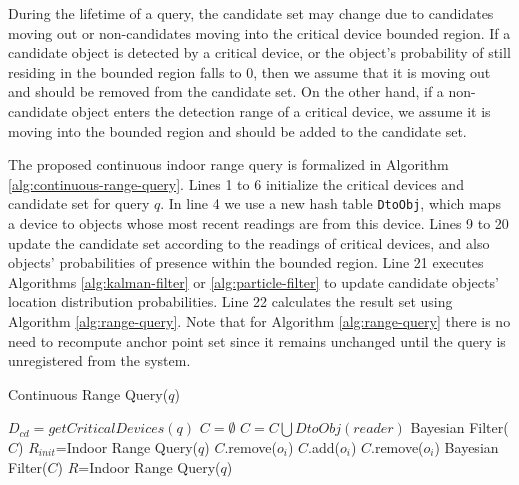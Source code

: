 \documentclass[12pt]{report}
\begin{document}
During the lifetime of a query, the candidate set may change due
to candidates moving out or non-candidates moving into the
critical device bounded region.  If a candidate object is detected
by a critical device, or the object's probability of still
residing in the bounded region falls to 0, then we assume that it
is moving out and should be removed from the candidate set.  On
the other hand, if a non-candidate object enters the detection
range of a critical device, we assume it is moving into the
bounded region and should be added to the candidate set.

The proposed continuous indoor range query is formalized in
Algorithm \ref{alg:continuous-range-query}.  Lines 1 to 6 initialize
the critical devices and candidate set for query \(q\).  In line 4
we use a new hash table \texttt{DtoObj}, which maps a device to objects
whose most recent readings are from this device.  Lines 9 to 20
update the candidate set according to the readings of critical
devices, and also objects' probabilities of presence within the
bounded region.  Line 21 executes Algorithms \ref{alg:kalman-filter}
or \ref{alg:particle-filter} to update candidate objects' location
distribution probabilities.  Line 22 calculates the result set
using Algorithm \ref{alg:range-query}.  Note that for Algorithm
\ref{alg:range-query} there is no need to recompute anchor point set
since it remains unchanged until the query is unregistered from
the system.

\begin{algorithm}[!t]
  \caption{Continuous Range Query(\(q\))}
  \label{alg:continuous-range-query}
  \small
  \begin{algorithmic}[1]
    \STATE \(D_{cd}=getCriticalDevices(q)\) \STATE \(C=\emptyset\)
    \STATE \(C=C\bigcup DtoObj(reader)\)
    \ENDFOR \STATE Bayesian Filter(\(C\)) \STATE \(R_{init}\)=Indoor Range
    Query(\(q\))
    \STATE \(C\).remove(\(o_i\))
    \ELSE
    \STATE \(C\).add(\(o_i\))
    \ENDIF
    \ENDFOR
    \STATE \(C\).remove(\(o_i\))
    \ENDIF
    \ENDFOR
    \STATE Bayesian Filter(\(C\))
    \STATE \(R\)=Indoor Range Query(\(q\))
    \ENDFOR
  \end{algorithmic}
\end{algorithm}
\end{document}
